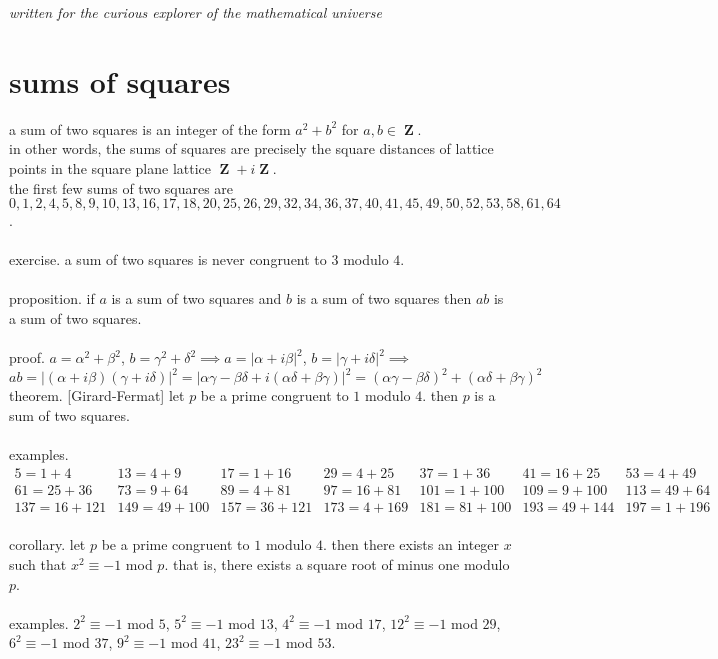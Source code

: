 \documentclass{article}
\DeclareMathOperator{\Z}{\mathbf{Z}}
\begin{document}
{\it written for the curious explorer of the mathematical universe}
\section*{sums of squares}
a sum of two squares is an integer of the form $a^2+b^2$ for $a,b\in\Z$. \\
in other words, the sums of squares are precisely the square distances of lattice points in the square plane lattice $\Z+i\Z$. \\
the first few sums of two squares are $0,1,2,4,5, 8,9,10,13,16, 17,18,20,25,26, 29,32,34,36,37, 40, 41, 45, 49, 50, 52, 53, 58, 61, 64$.\\\\
exercise. a sum of two squares is never congruent to $3$ modulo $4$. \\\\
proposition. if $a$ is a sum of two squares and $b$ is a sum of two squares then $ab$ is a sum of two squares. \\\\
proof. $a=\alpha^2+\beta^2$, $b=\gamma^2+\delta^2 \implies a=|\alpha+i\beta|^2$, $b=|\gamma+i\delta|^2\implies$ $$ab=|(\alpha+i\beta)(\gamma+i\delta)|^2=|\alpha\gamma-\beta\delta + i (\alpha\delta+\beta\gamma)|^2=(\alpha\gamma-\beta\delta)^2+(\alpha\delta+\beta\gamma)^2$$
theorem. [Girard-Fermat] let $p$ be a prime congruent to $1$ modulo $4$. then $p$ is a sum of two squares. \\\\
examples. $\begin{array}{ccccccc}
5=1+4 & 13=4+9 & 17=1+16 & 29=4+25 & 37=1+36 & 41=16+25 & 53=4+49\\
{61=25+36} & 73=9+64 & {89=4+81} & {97=16+81} & 101=1+100 & 109=9+100 & 113=49+64\\
137=16+121 & 149=49+100 & 157=36+121 & 173=4+169 & 181=81+100 & 193=49+144 & 197=1+196
\end{array}$ \\\\
corollary. let $p$ be a prime congruent to $1$ modulo $4$. then there exists an integer $x$ such that $x^2\equiv -1$ mod $p$. that is, there exists a square root of minus one modulo $p$. \\\\
examples. $2^2\equiv -1$ mod $5$, $5^2\equiv -1$ mod $13$, $4^2\equiv -1$ mod $17$, $12^2\equiv-1$ mod $29$, $6^2\equiv-1$ mod $37$, $9^2\equiv-1$ mod $41$, $23^2\equiv-1$ mod $53$. \\\\
\end{document}

